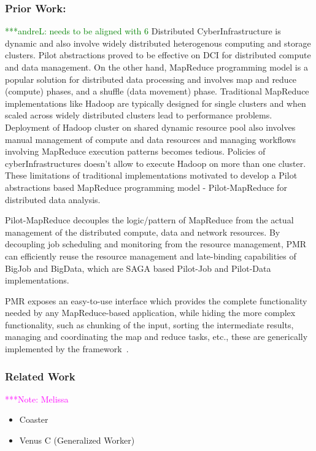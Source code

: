 \documentclass[times]{cpeauth}
\newcommand{\alnote}[1]{ {\textcolor{green} { ***andreL: #1 }}}
\newcommand{\note}[1]{ {\textcolor{magenta} { ***Note: #1 }}}
\newcommand{\alnote}[1]{}
\newcommand{\note}[1]{}
\begin{document}
\subsubsection*{Prior Work:}
\alnote{needs to be aligned with 6}
Distributed CyberInfrastructure is dynamic and also involve widely distributed
heterogenous computing and storage clusters. Pilot abstractions proved to be
effective on DCI for distributed compute and data management. On the other
hand, MapReduce programming model is a popular solution for distributed data
processing and involves map and reduce (compute) phases, and a shuffle (data
movement) phase. Traditional MapReduce implementations like Hadoop are
typically designed for single clusters and when scaled across widely
distributed clusters lead to performance problems. Deployment of Hadoop
cluster on shared dynamic resource pool also involves manual management of
compute and data resources and managing workflows involving MapReduce
execution patterns becomes tedious. Policies of cyberInfrastructures doesn't
allow to execute Hadoop on more than one cluster. These limitations of
traditional implementations motivated to develop a Pilot abstractions based
MapReduce programming model - Pilot-MapReduce for distributed data analysis.

Pilot-MapReduce decouples the logic/pattern of MapReduce from the actual
management of the distributed compute, data and network resources. By
decoupling job scheduling and monitoring from the resource management, PMR can
efficiently reuse the resource management and late-binding capabilities of
BigJob and BigData, which are SAGA based Pilot-Job and Pilot-Data
implementations.

PMR exposes an easy-to-use interface which provides the complete functionality
needed by any MapReduce-based application, while hiding the more complex
functionality, such as chunking of the input, sorting the intermediate
results, managing and coordinating the map and reduce tasks, etc., these are
generically implemented by the
framework~\cite{Mantha:2012:PEF:2287016.2287020}.



\subsubsection*{Related Work} 
\note{Melissa}

\begin{itemize}
	\item Coaster
	\item Venus C (Generalized Worker)
\end{itemize}
\end{document}
